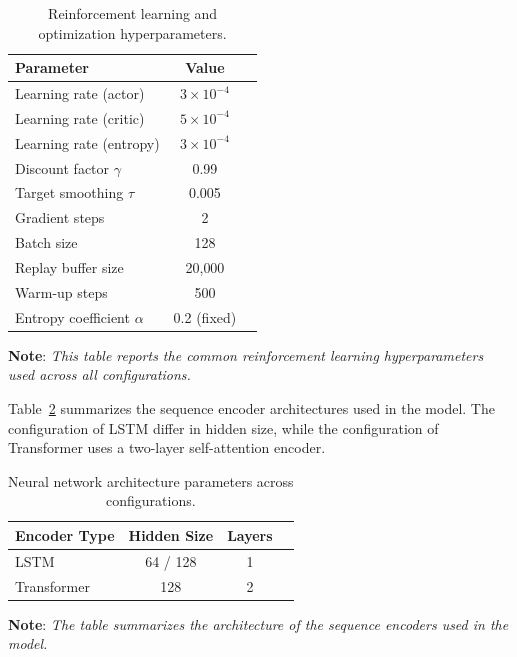 \documentclass[]{elsarticle}
\begin{document}
\begin{table}[H]
\centering
\small
\setlength{\tabcolsep}{3pt}
\renewcommand{\arraystretch}{0.90}

\begin{tabular}{lcc}
\toprule
\textbf{Parameter} & \textbf{Value} \\
\midrule
Learning rate (actor) & $3 \times 10^{-4}$ \\
Learning rate (critic) & $5 \times 10^{-4}$ \\
Learning rate (entropy) & $3 \times 10^{-4}$ \\
Discount factor $\gamma$ & 0.99 \\
Target smoothing $\tau$ & 0.005 \\
Gradient steps & 2 \\
Batch size & 128 \\
Replay buffer size & 20{,}000 \\
Warm-up steps & 500 \\
Entropy coefficient $\alpha$ & 0.2 (fixed) \\
\bottomrule
\end{tabular}
\caption{Reinforcement learning and optimization hyperparameters.}
\label{tab:rl_params}
\end{table}
\vspace{-0.7cm}
\linespread{0.65}\selectfont 
\begin{center}
{\scriptsize \textbf{Note}: \textit{This table reports the common reinforcement learning hyperparameters used across all configurations.}}
\end{center}

\linespread{1.5}\selectfont

Table~\ref{tab:model_params} summarizes the sequence encoder architectures used in the model. The configuration of LSTM differ in hidden size, while the configuration of Transformer uses a two-layer self-attention encoder.

\begin{table}[H]
\centering
\small
\begin{tabular}{lccc}
\toprule
\textbf{Encoder Type} & \textbf{Hidden Size} & \textbf{Layers} \\
\midrule
LSTM & 64 / 128 & 1 \\
Transformer & 128 & 2 \\
\bottomrule
\end{tabular}
\caption{Neural network architecture parameters across configurations.}
\label{tab:model_params}
\end{table}
\vspace{-0.8cm}
\linespread{0.65}\selectfont 
\begin{center}
{\scriptsize \textbf{Note}: \textit{The table summarizes the architecture of the sequence encoders used in the model.}}
\end{center}
\end{document}
